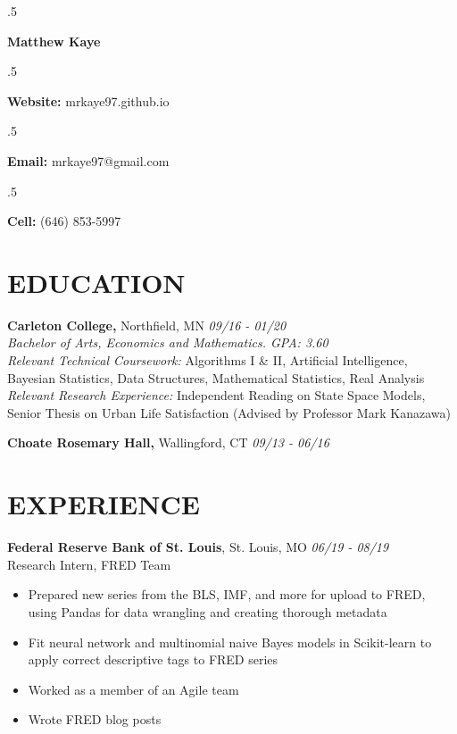 \documentclass[margin, 10pt]{res} %
\begin{document}
\singlespacing

\moveleft.5\hoffset\centerline{\LARGE\bf Matthew Kaye} %
\medskip
\moveleft.5\hoffset\centerline{\textbf{Website:} mrkaye97.github.io}
\moveleft.5\hoffset\centerline{\textbf{Email:} mrkaye97@gmail.com}
\moveleft.5\hoffset\centerline{\textbf{Cell:} (646) 853-5997}


\begin{resume}


\section{EDUCATION}

{\sl} \textbf{Carleton College,} Northfield, MN \hfill \textit{09/16 - 01/20}\\
{\sl Bachelor of Arts, Economics and Mathematics. GPA: 3.60} \smallskip\\
{\sl Relevant Technical Coursework: } Algorithms I \& II, Artificial Intelligence, Bayesian Statistics, Data Structures, Mathematical Statistics, Real Analysis \smallskip\\
{\sl Relevant Research Experience: } Independent Reading on State Space Models, Senior Thesis on Urban Life Satisfaction (Advised by Professor Mark Kanazawa)

{\sl} \textbf{Choate Rosemary Hall,} Wallingford, CT \hfill \textit{09/13 -  06/16}

\section{EXPERIENCE}
{\sl} \textbf{Federal Reserve Bank of St. Louis}, St. Louis, MO \hfill \textit{06/19 - 08/19}\\
{\sl} Research Intern, FRED Team \smallskip
{\sl} \begin{itemize}
	\item Prepared new series from the BLS, IMF, and more for upload to FRED, using Pandas for data wrangling and creating thorough metadata
	\item Fit neural network and multinomial naive Bayes models in Scikit-learn to apply correct descriptive tags to FRED series
	\item Worked as a member of an Agile team
	\item Wrote FRED blog posts
\end{itemize}


\end{resume}
\end{document}
